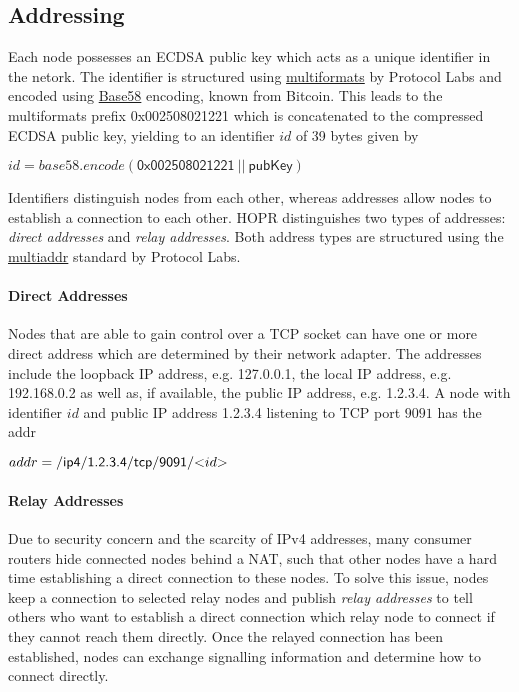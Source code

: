 \subsection{Addressing}
\label{sec:p2p:addressing}

Each node possesses an ECDSA public key which acts as a unique identifier in the netork. The identifier is structured using \href{https://github.com/multiformats/multiformats}{multiformats} by Protocol Labs and encoded using \href{https://en.bitcoin.it/wiki/Base58Check_encoding}{Base58} encoding, known from Bitcoin. This leads to the multiformats prefix \textsf{0x002508021221} which is concatenated to the compressed ECDSA public key, yielding to an identifier $id$ of 39 bytes given by

\begin{center}
    $id = base58.encode(\mathsf{0x002508021221} \ || \ \mathsf{pubKey})$
\end{center}

Identifiers distinguish nodes from each other, whereas addresses allow nodes to establish a connection to each other. HOPR distinguishes two types of addresses: \textit{direct addresses} and \textit{relay addresses}. Both address types are structured using the \href{https://github.com/multiformats/multiaddr}{multiaddr} standard by Protocol Labs.

\paragraph{Direct Addresses}

Nodes that are able to gain control over a TCP socket can have one or more direct address which are determined by their network adapter. The addresses include the loopback IP address, e.g. \textsf{127.0.0.1}, the local IP address, e.g. \textsf{192.168.0.2} as well as, if available, the public IP address, e.g. \textsf{1.2.3.4}. A node with identifier $id$ and public IP address \textsf{1.2.3.4} listening to TCP port $9091$ has the addr

\begin{center}
    $addr = \mathsf{/ip4/1.2.3.4/tcp/9091/}\text{\textless$id$\textgreater{}}$
\end{center}

\paragraph{Relay Addresses}

Due to security concern and the scarcity of IPv4 addresses, many consumer routers hide connected nodes behind a NAT, such that other nodes have a hard time establishing a direct connection to these nodes. To solve this issue, nodes keep a connection to selected relay nodes and publish \textit{relay addresses} to tell others who want to establish a direct connection which relay node to connect if they cannot reach them directly. Once the relayed connection has been established, nodes can exchange signalling information and determine how to connect directly.

